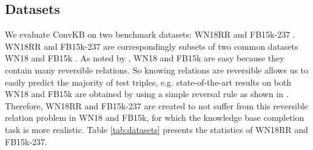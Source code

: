 \documentclass[11pt,a4paper]{article}
\begin{document}
\subsection{Datasets}
We evaluate ConvKB on two benchmark datasets: WN18RR \citep{Dettmers2017} and FB15k-237 \citep{toutanova-chen:2015:CVSC}.
WN18RR and FB15k-237 are correspondingly subsets of two common datasets WN18 and FB15k \citep{NIPS2013_5071}.
As noted by \citet{toutanova-chen:2015:CVSC}, WN18 and FB15k are easy because they contain many reversible relations. So knowing relations are reversible allows us to easily predict the majority of test triples, e.g. state-of-the-art results on both WN18 and FB15k are obtained by using a simple reversal rule as shown in \citet{Dettmers2017}. 
Therefore, WN18RR and FB15k-237 are created to not suffer from this reversible relation problem in WN18 and FB15k, for which the knowledge base completion task is more realistic.  
Table \ref{tab:datasets} presents the statistics of WN18RR and FB15k-237.

\begin{table}[!t]
\centering
{}
\caption{Statistics of the experimental datasets.}
\label{tab:datasets}
\end{table}
\end{document}
